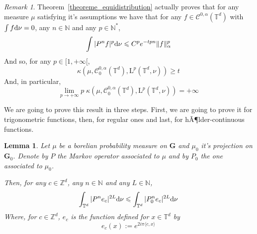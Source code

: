 \documentclass[11pt]{amsart}
\newtheorem{lemma}[theorem]{Lemma}
\theoremstyle{definition}
\theoremstyle{remark}
\newtheorem{remark}[theorem]{Remark}
\numberwithin{equation}{section}
\begin{document}
\begin{remark}
Theorem~\ref{theoreme_equidistribution} actually proves that for any measure $\mu$ satisfying it's assumptions we have that for any $f\in \mathcal{C}^{0,\alpha}({\mathbb T}^d)$ with$\int f{{\rm d}}\nu=0$, any $n\in {\mathbb N}$ and any $p\in {\mathbb N}^\ast$,
\[
\int |P^n f|^p {{\rm d}}\nu \leqslant C^p e^{-tpn} \|f\|_\alpha^p
\]
And so, for any $p\in [1,+\infty[$,
\[
\kappa\left( \mu,\mathcal{C}^{0,\alpha}_0\left({\mathbb T}^d\right), \mathrm{L}^p\left({\mathbb T}^d,\nu\right) \right) \geqslant t
\]
And, in particular,
\[
\lim_{p\to +\infty} p\;\kappa\left(\mu,\mathcal{C}^{0,\alpha}_0\left({\mathbb T}^d\right), \mathrm{L}^p\left({\mathbb T}^d,\nu\right) \right)  = +\infty
\]
\end{remark}

We are going to prove this result in three steps. First, we are going to prove it for trigonometric functions, then, for regular ones and last, for hÃ¶lder-continuous functions.

\begin{lemma}
Let $\mu$ be a borelian probability measure on ${\mathbf G}$ and $\mu_0$ it's projection on ${\mathbf G}_0$. Denote by $P$ the Markov operator associated to $\mu$ and by  $P_0$ the one associated to $\mu_0$.

Then, for any $c \in {\mathbb Z}^d$, any $n\in {\mathbb N}$ and any $L\in {\mathbb N}$,
\[
\int_{{\mathbb T}^d} |P^n e_c|^{2L} {{\rm d}}\nu \leqslant \int_{{\mathbb T}^d} |P_0^n e_c|^{2L} {{\rm d}}\nu
\]
Where, for $c\in {\mathbb Z}^d$, $e_c$ is the function defined for $x\in {\mathbb T}^d$ by
\[
e_c(x) := e^{2i\pi \langle c,x\rangle}
\]
\end{lemma}
\end{document}
